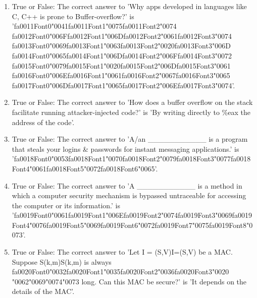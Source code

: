 \documentclass[12pt]{article}
\begin{document}
\begin{enumerate}[label=\arabic*.]
\item True or False: The correct answer to 'Why apps developed in languages like C, C++ is prone to Buffer-overflow?' is '{\csname fa0011Font0\endcsname\char"0041}{\csname fa0011Font1\endcsname\char"0075}{\csname fa0011Font2\endcsname\char"0074} {\csname fa0012Font0\endcsname\char"006F}{\csname fa0012Font1\endcsname\char"006D}{\csname fa0012Font2\endcsname\char"0061}{\csname fa0012Font3\endcsname\char"0074} {\csname fa0013Font0\endcsname\char"0069}{\csname fa0013Font1\endcsname\char"0063}{\csname fa0013Font2\endcsname\char"0020}{\csname fa0013Font3\endcsname\char"006D} {\csname fa0014Font0\endcsname\char"0065}{\csname fa0014Font1\endcsname\char"006D}{\csname fa0014Font2\endcsname\char"006F}{\csname fa0014Font3\endcsname\char"0072} {\csname fa0015Font0\endcsname\char"0079}{\csname fa0015Font1\endcsname\char"0020}{\csname fa0015Font2\endcsname\char"006D}{\csname fa0015Font3\endcsname\char"0061} {\csname fa0016Font0\endcsname\char"006E}{\csname fa0016Font1\endcsname\char"0061}{\csname fa0016Font2\endcsname\char"0067}{\csname fa0016Font3\endcsname\char"0065} {\csname fa0017Font0\endcsname\char"006D}{\csname fa0017Font1\endcsname\char"0065}{\csname fa0017Font2\endcsname\char"006E}{\csname fa0017Font3\endcsname\char"0074}'.
\item True or False: The correct answer to 'How does a buffer overflow on the stack facilitate running attacker-injected code?' is 'By writing directly to \%eax the address of the code'.
\item True or False: The correct answer to 'A/an \_\_\_\_\_\_\_\_\_\_\_ is a program that steals your logins \& passwords for instant messaging applications.' is '{\csname fa0018Font0\endcsname\char"0053}{\csname fa0018Font1\endcsname\char"0070}{\csname fa0018Font2\endcsname\char"0079}{\csname fa0018Font3\endcsname\char"0077}{\csname fa0018Font4\endcsname\char"0061}{\csname fa0018Font5\endcsname\char"0072}{\csname fa0018Font6\endcsname\char"0065}'.
\item True or False: The correct answer to 'A \_\_\_\_\_\_\_\_\_\_\_ is a method in which a computer security mechanism is bypassed untraceable for accessing the computer or its information.' is '{\csname fa0019Font0\endcsname\char"0061}{\csname fa0019Font1\endcsname\char"006E}{\csname fa0019Font2\endcsname\char"0074}{\csname fa0019Font3\endcsname\char"0069}{\csname fa0019Font4\endcsname\char"0076}{\csname fa0019Font5\endcsname\char"0069}{\csname fa0019Font6\endcsname\char"0072}{\csname fa0019Font7\endcsname\char"0075}{\csname fa0019Font8\endcsname\char"0073}'.
\item True or False: The correct answer to 'Let I = (S,V)I=(S,V) be a MAC. Suppose S(k,m)S(k,m) is always {\csname fa0020Font0\endcsname\char"0032}{\csname fa0020Font1\endcsname\char"0035}{\csname fa0020Font2\endcsname\char"0036}{\csname fa0020Font3\endcsname\char"0020} {\char"0062}{\char"0069}{\char"0074}{\char"0073} long. Can this MAC be secure?' is 'It depends on the details of the MAC'.
\end{enumerate}
\end{document}
